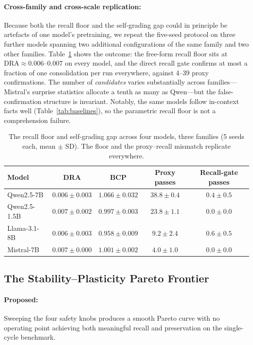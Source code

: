 \paragraph{Cross-family and cross-scale replication:} Because both the recall floor and the self-grading gap could in principle be artefacts of one model's pretraining, we repeat the five-seed protocol on three further models spanning two additional configurations of the same family and two other families. Table~\ref{tab:cross_model} shows the outcome: the free-form recall floor sits at $\mathrm{DRA} \approx 0.006$--$0.007$ on every model, and the direct recall gate confirms at most a fraction of one consolidation per run everywhere, against 4--39 proxy confirmations. The number of \emph{candidates} varies substantially across families---Mistral's surprise statistics allocate a tenth as many as Qwen---but the false-confirmation structure is invariant. Notably, the same models follow in-context facts well (Table~\ref{tab:baselines}), so the parametric recall floor is not a comprehension failure.

\begin{table}[t]
\centering
\caption{The recall floor and self-grading gap across four models, three families (5 seeds each, mean $\pm$ SD). The floor and the proxy--recall mismatch replicate everywhere.}
\label{tab:cross_model}
\begin{tabular}{lcccc}
\toprule
Model & DRA & BCP & Proxy passes & Recall-gate passes \\
\midrule
Qwen2.5-7B    & $0.006 \pm 0.003$ & $1.066 \pm 0.032$ & $38.8 \pm 0.4$ & $0.4 \pm 0.5$ \\
Qwen2.5-1.5B  & $0.007 \pm 0.002$ & $0.997 \pm 0.003$ & $23.8 \pm 1.1$ & $0.0 \pm 0.0$ \\
Llama-3.1-8B  & $0.006 \pm 0.003$ & $0.958 \pm 0.009$ & $9.2 \pm 2.4$  & $0.6 \pm 0.5$ \\
Mistral-7B    & $0.007 \pm 0.000$ & $1.001 \pm 0.002$ & $4.0 \pm 1.0$  & $0.0 \pm 0.0$ \\
\bottomrule
\end{tabular}
\end{table}

\subsection{The Stability--Plasticity Pareto Frontier}
\label{sec:results_pareto}

\paragraph{Proposed:} Sweeping the four safety knobs produces a smooth Pareto curve with no operating point achieving both meaningful recall and preservation on the single-cycle benchmark.

